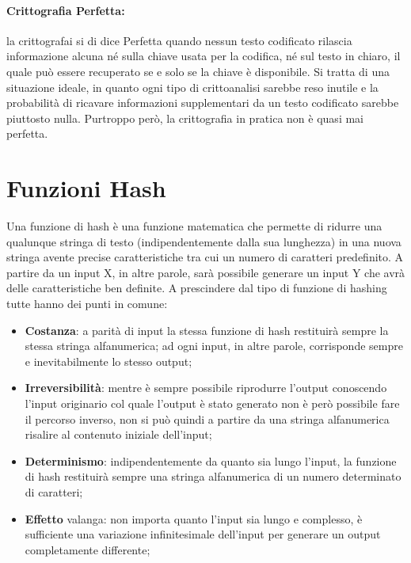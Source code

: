 \paragraph{Crittografia Perfetta: } la crittografai si di dice Perfetta quando
nessun
testo codificato rilascia informazione alcuna né
sulla chiave usata per la codifica, né sul testo in chiaro,
il quale può essere recuperato se e solo se
la chiave è disponibile.
Si tratta di una situazione ideale, in quanto ogni tipo di crittoanalisi sarebbe
reso inutile e la
probabilità di ricavare informazioni supplementari da un testo codificato
sarebbe piuttosto nulla.
Purtroppo però, la crittografia in pratica non è quasi mai perfetta.

\section{Funzioni Hash}

Una funzione di hash è una funzione matematica che permette di ridurre una
qualunque stringa di
testo (indipendentemente dalla sua lunghezza) in una nuova stringa avente
precise caratteristiche
tra cui un numero di caratteri predefinito. A partire da un input X, in
altre parole, sarà possibile
generare un input Y che avrà delle caratteristiche ben definite.
A prescindere dal tipo di funzione di hashing tutte hanno dei punti in comune:

\begin{itemize}
    \item \textbf{Costanza}: a parità di input la stessa funzione di hash
          restituirà sempre la stessa stringa
          alfanumerica; ad ogni input, in altre parole, corrisponde sempre e
          inevitabilmente lo stesso
          output;
    \item \textbf{Irreversibilità}: mentre è sempre possibile riprodurre
          l'output conoscendo l'input originario
          col quale l'output è stato generato non è però possibile fare
          il percorso inverso, non si può
          quindi a partire da una stringa alfanumerica risalire al contenuto
          iniziale dell'input;
    \item \textbf{Determinismo}: indipendentemente da quanto sia lungo l'input,
          la funzione di hash restituirà
          sempre una stringa alfanumerica di un numero determinato di caratteri;
    \item \textbf{Effetto} valanga: non importa quanto l'input sia lungo e
          complesso, è sufficiente una
          variazione infinitesimale dell'input per generare un output
          completamente differente;
\end{itemize}

